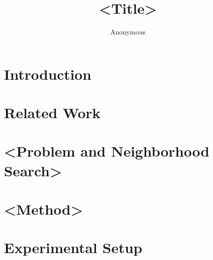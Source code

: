 \documentclass[runningheads]{llncs}
\newif\ifblind \blindtrue        %
\begin{document}
\title{<Title>}
\ifblind
  \author{Anonymous}
\else
  \author{Remigiusz Wojew\'{o}dzki \and Wojciech Bo\.{z}ejko}
  \authorrunning{R. Wojew\'{o}dzki and W. Bo\.{z}ejko}
  \institute{Department of Control and Quantum Computing,
    Faculty of Information and Communication Technology,
    Wroc\l{}aw University of Science and Technology, Wroc\l{}aw, Poland\\
    \email{remigiusz.wojewodzki@pwr.edu.pl, wojciech.bozejko@pwr.edu.pl}}
\fi
\maketitle

\begin{abstract}
\end{abstract}

\section{Introduction}

\section{Related Work}

\section{<Problem and Neighborhood Search>}

\section{<Method>}

\section{Experimental Setup}
\end{document}
